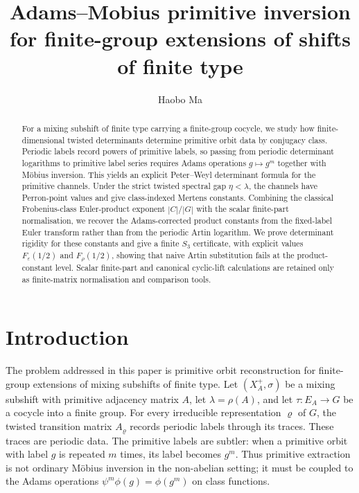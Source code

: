 \documentclass[11pt,a4paper]{amsart}
\title[Adams--Mobius primitive inversion]{Adams--Mobius primitive inversion for finite-group extensions of shifts of finite type}
\author[Haobo Ma]{Haobo Ma}
\date{}
\theoremstyle{plain}
\theoremstyle{definition}
\theoremstyle{remark}
\begin{document}
\begin{abstract}
For a mixing subshift of finite type carrying a finite-group cocycle, we
study how finite-dimensional twisted determinants determine primitive orbit
data by conjugacy class.  Periodic labels record powers of primitive labels,
so passing from periodic determinant logarithms to primitive label series
requires Adams operations \(g\mapsto g^m\) together with M\"obius
inversion.  This yields an explicit Peter--Weyl determinant formula for the
primitive channels.  Under the strict twisted spectral gap
\(\eta<\lambda\), the channels have Perron-point values and give
class-indexed Mertens constants.  Combining the classical Frobenius-class
Euler-product exponent \(|C|/|G|\) with the scalar finite-part
normalisation, we recover the Adams-corrected product constants from the
fixed-label Euler transform rather than from the periodic Artin logarithm.
We prove determinant rigidity for these constants and give a finite
\(S_3\) certificate, with explicit values \(F_\varepsilon(1/2)\) and
\(F_\rho(1/2)\), showing that naive Artin substitution fails at the
product-constant level.  Scalar finite-part and canonical cyclic-lift
calculations are retained only as finite-matrix normalisation and comparison
tools.
\end{abstract}


\maketitle

\section{Introduction}\label{sec:introduction}

The problem addressed in this paper is primitive orbit reconstruction
for finite-group extensions of mixing subshifts of finite type. Let
\((X_A^+,\sigma)\) be a mixing subshift with primitive adjacency matrix
\(A\), let \(\lambda=\rho(A)\), and let \(\tau:E_A\to G\) be a cocycle
into a finite group. For every irreducible representation \(\varrho\)
of \(G\), the twisted transition matrix \(A_\varrho\) records periodic
labels through its traces. These traces are periodic data. The
primitive labels are subtler: when a primitive orbit with label \(g\)
is repeated \(m\) times, its label becomes \(g^m\). Thus primitive
extraction is not ordinary M\"obius inversion in the non-abelian
setting; it must be coupled to the Adams operations
\(\psi^m\phi(g)=\phi(g^m)\) on class functions.
\end{document}
